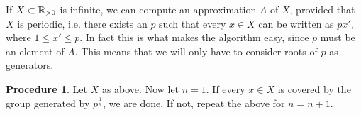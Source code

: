 \documentclass[a4paper]{article}
\newtheorem{theorem}{Theorem}[section]
\theoremstyle{definition}
\newtheorem{procedure}[theorem]{Procedure}
\begin{document}
%
%
%
%

If $X \subset \mathbb{R}_{> 0}$ is infinite, we can compute an approximation $A$ of $X$, provided that $X$ is periodic, i.e. there exists an $p$ such that every $x \in X$ can be written as $px'$, where $1 \leq x' \leq p$.
In fact this is what makes the algorithm easy, since $p$ must be an element of $A$.
This means that we will only have to consider roots of $p$ as generators.
\begin{procedure}
	Let $X$ as above.
	Now let $n=1$.
	If every $x \in X$ is covered by the group generated by $p^\frac{1}{n}$, we are done.
	If not, repeat the above for $n=n+1$.
	\label{infinite_approximation_procedure}
\end{procedure}
\end{document}
